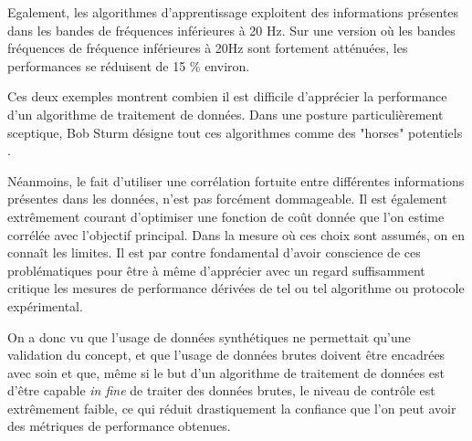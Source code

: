   Egalement, les algorithmes d'apprentissage exploitent des informations présentes dans les bandes de fréquences inférieures à 20 Hz. Sur une version où les bandes fréquences de fréquence inférieures à 20Hz sont fortement atténuées, les performances se réduisent de 15 \% environ.

  Ces deux exemples montrent combien il est difficile d'apprécier la performance d'un algorithme de traitement de données. Dans une posture particulièrement sceptique, Bob Sturm désigne tout ces algorithmes comme des "horses" potentiels .

  Néanmoins, le fait d'utiliser une corrélation fortuite entre différentes informations présentes dans les données, n'est pas forcément dommageable. Il est également extrêmement courant d'optimiser une fonction de coût donnée que l'on estime corrélée avec l'objectif principal. Dans la mesure où ces choix sont assumés, on en connaît les limites. Il est par contre fondamental d'avoir conscience de ces problématiques pour être à même d'apprécier avec un regard suffisamment critique les mesures de performance dérivées de tel ou tel algorithme ou protocole expérimental\cite{lagrangehal-01635373}.

  On a donc vu que l'usage de données synthétiques ne permettait qu'une validation du concept, et que l'usage de données brutes doivent être encadrées avec soin et que, même si le but d'un algorithme de traitement de données est d'être capable \textit{in fine} de traiter des données brutes, le niveau de contrôle est extrêmement faible, ce qui réduit drastiquement la confiance que l'on peut avoir des métriques de performance obtenues.

